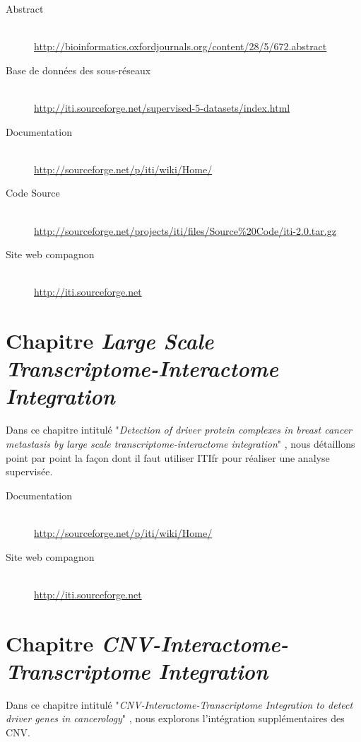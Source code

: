 			\begin{description}
				\item [Abstract]    \hfill \\
					\url{http://bioinformatics.oxfordjournals.org/content/28/5/672.abstract}
				\item [Base de données des sous-réseaux]    \hfill \\
					\url{http://iti.sourceforge.net/supervised-5-datasets/index.html}
				\item [Documentation]                       \hfill \\
					\url{http://sourceforge.net/p/iti/wiki/Home/}
				\item [Code Source]                         \hfill \\
					\url{http://sourceforge.net/projects/iti/files/Source%20Code/iti-2.0.tar.gz}
				\item [Site web compagnon]    \hfill \\
					\url{http://iti.sourceforge.net}
			\end{description}

			

		\section{\textcolor{white!15!black}{Chapitre \emph{Large Scale Transcriptome-Interactome Integration}}}\label{app:Garcia2013}
			Dans ce chapitre intitulé "\emph{Detection of driver protein complexes in breast cancer metastasis by large scale transcriptome-interactome integration}" \citep{Garcia2013}, nous détaillons point par point la façon dont il faut utiliser \acs{ITIfr} pour réaliser une analyse supervisée.

			\begin{description}
				\item [Documentation]                       \hfill \\
					\url{http://sourceforge.net/p/iti/wiki/Home/}
				\item [Site web compagnon]    \hfill \\
					\url{http://iti.sourceforge.net}
			\end{description}

			

		\section{\textcolor{white!15!black}{Chapitre \emph{CNV-Interactome-Transcriptome Integration}}}\label{app:Garcia2013b}
			Dans ce chapitre intitulé "\emph{CNV-Interactome-Transcriptome Integration to detect driver genes in cancerology}" \citep{Garcia2013b}, nous explorons l'intégration supplémentaires des \acs{CNV}.

